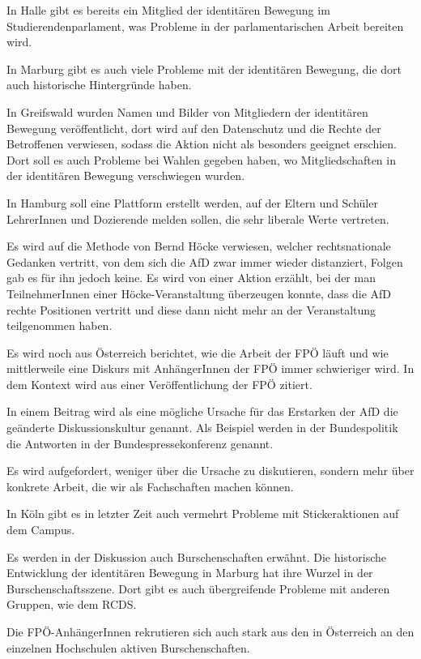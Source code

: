 In Halle gibt es bereits ein Mitglied der identitären Bewegung im Studierendenparlament, was Probleme in der parlamentarischen Arbeit bereiten wird. 

In Marburg gibt es auch viele Probleme mit der identitären Bewegung, die dort auch historische Hintergründe haben. 

In Greifswald wurden Namen und Bilder von Mitgliedern der identitären Bewegung veröffentlicht, dort wird auf den Datenschutz und die Rechte der Betroffenen verwiesen, sodass die Aktion nicht als besonders geeignet erschien. Dort soll es auch Probleme bei Wahlen gegeben haben, wo Mitgliedschaften in der identitären Bewegung verschwiegen wurden. 

In Hamburg soll eine Plattform erstellt werden, auf der Eltern und Schüler LehrerInnen und Dozierende melden sollen, die sehr liberale Werte vertreten.  

Es wird auf die Methode von Bernd Höcke verwiesen, welcher rechtsnationale Gedanken vertritt, von dem sich die AfD zwar immer wieder distanziert, Folgen gab es für ihn jedoch keine. Es wird von einer Aktion erzählt, bei der man TeilnehmerInnen einer Höcke-Veranstaltung überzeugen konnte, dass die AfD rechte Positionen vertritt und diese dann nicht mehr an der Veranstaltung teilgenommen haben. 

Es wird noch aus Österreich berichtet, wie die Arbeit der FPÖ läuft und wie mittlerweile eine Diskurs mit AnhängerInnen der FPÖ immer schwieriger wird. In dem Kontext wird aus einer Veröffentlichung der FPÖ zitiert. 

In einem Beitrag wird als eine mögliche Ursache für das Erstarken der AfD die geänderte Diskussionskultur genannt. Als Beispiel werden in der Bundespolitik die Antworten in der Bundespressekonferenz genannt. 

Es wird aufgefordert, weniger über die Ursache zu diskutieren, sondern mehr über konkrete Arbeit, die wir als Fachschaften machen können. 

In Köln gibt es in letzter Zeit auch vermehrt Probleme mit Stickeraktionen auf dem Campus. 

Es werden in der Diskussion auch Burschenschaften erwähnt. Die historische Entwicklung der identitären Bewegung in Marburg hat ihre Wurzel in der Burschenschaftsszene. Dort gibt es auch übergreifende Probleme mit anderen Gruppen, wie dem RCDS. 

Die FPÖ-AnhängerInnen rekrutieren sich auch stark aus den in Österreich an den einzelnen Hochschulen aktiven Burschenschaften. 

